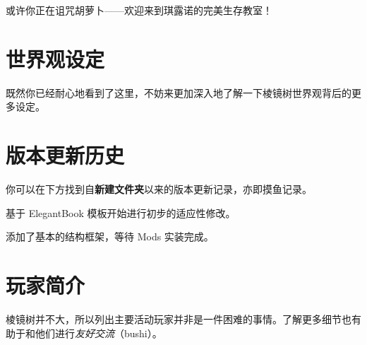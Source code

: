 \documentclass[lang=cn,newtx,10pt,scheme=chinese]{elegantbook}
\begin{document}
或许你正在诅咒胡萝卜——欢迎来到琪露诺的完美生存教室！

\chapter{世界观设定}

既然你已经耐心地看到了这里，不妨来更加深入地了解一下棱镜树世界观背后的更多设定。

\nocite{*}
\appendix

\chapter{版本更新历史}

你可以在下方找到自\textbf{新建文件夹}以来的版本更新记录，亦即摸鱼记录。


\begin{change}
  \item 基于 ElegantBook 模板开始进行初步的适应性修改。
  \item 添加了基本的结构框架，等待 Mods 实装完成。
\end{change}

\chapter{玩家简介}

棱镜树并不大，所以列出主要活动玩家并非是一件困难的事情。了解更多细节也有助于和他们进行\textit{友好交流}（bushi）。
\end{document}
